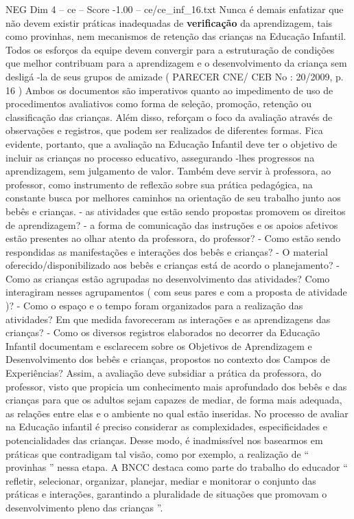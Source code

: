 \begin{textsample}{NEG Dim 4 – ce – Score -1.00 – ce/ce\_inf\_16.txt}
Nunca é demais enfatizar que não devem existir práticas inadequadas de \textbf{verificação} da aprendizagem, tais como provinhas, nem mecanismos de retenção das crianças na Educação Infantil.
Todos os esforços da equipe devem convergir para a estruturação de condições que melhor contribuam para a aprendizagem e o desenvolvimento da criança sem desligá -la de seus grupos de amizade ( PARECER CNE/ CEB No : 20/2009, p. 16 ) Ambos os documentos são imperativos quanto ao impedimento de uso de procedimentos avaliativos como forma de seleção, promoção, retenção ou classificação das crianças.
Além disso, reforçam o foco da avaliação através de observações e registros, que podem ser realizados de diferentes formas.
Fica evidente, portanto, que a avaliação na Educação Infantil deve ter o objetivo de incluir as crianças no processo educativo, assegurando -lhes progressos na aprendizagem, sem julgamento de valor.
Também deve servir à professora, ao professor, como instrumento de reflexão sobre sua prática pedagógica, na constante busca por melhores caminhos na orientação de seu trabalho junto aos bebês e crianças. - as atividades que estão sendo propostas promovem os direitos de aprendizagem? - a forma de comunicação das instruções e os apoios afetivos estão presentes ao olhar atento da professora, do professor? - Como estão sendo respondidas as manifestações e interações dos bebês e crianças? - O material oferecido/disponibilizado aos bebês e crianças está de acordo o planejamento? - Como as crianças estão agrupadas no desenvolvimento das atividades?
Como interagiram nesses agrupamentos ( com seus pares e com a proposta de atividade )? - Como o espaço e o tempo foram organizados para a realização das atividades?
Em que medida favoreceram as interações e as aprendizagens das crianças? - Como os diversos registros elaborados no decorrer da Educação Infantil documentam e esclarecem sobre os Objetivos de Aprendizagem e Desenvolvimento dos bebês e crianças, propostos no contexto dos Campos de Experiências?
Assim, a avaliação deve subsidiar a prática da professora, do professor, visto que propicia um conhecimento mais aprofundado dos bebês e das crianças para que os adultos sejam capazes de mediar, de forma mais adequada, as relações entre elas e o ambiente no qual estão inseridas.
No processo de avaliar na Educação infantil é preciso considerar as complexidades, especificidades e potencialidades das crianças.
Desse modo, é inadmissível nos basearmos em práticas que contradigam tal visão, como por exemplo, a realização de “ provinhas ” nessa etapa.
A BNCC destaca como parte do trabalho do educador “ refletir, selecionar, organizar, planejar, mediar e monitorar o conjunto das práticas e interações, garantindo a pluralidade de situações que promovam o desenvolvimento pleno das crianças ”.

\end{textsample}
